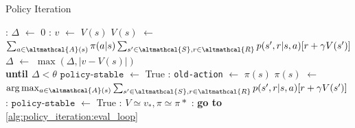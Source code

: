 \documentclass{article}
\newcommand*\Let[2]{\State #1 $\gets$ #2}
\begin{document}
\begin{algorithm}[H]
	\caption{Policy Iteration
		\label{alg:policy_eval}}
	\begin{algorithmic}[1]
		\Statex
		\Loop:  \label{alg:policy_iteration:eval_loop}
		\Let{$\Delta$}{0}
		: 
		\Let{$v$}{$V(s)$}
		\Let{$V(s)$}{$\sum_{a \in \altmathcal{A}(s)} \pi(a|s) \sum_{s' \in \altmathcal{S}, r \in \altmathcal{R}} p(s', r | s, a) [r + \gamma V(s')]$}
		\Let{$\Delta$}{$\max(\Delta, |v - V(s)|)$}
		\EndFor
		\EndLoop\\\textbf{until $\Delta < \theta$}
		\Statex
		\Let{$\texttt{policy-stable}$}{True} 
		: 
		\Let{\texttt{old-action}}{$\pi(s)$}
		\Let{$\pi(s)$}{$\arg \max_{a \in \altmathcal{A}(s)} \sum_{s' \in \altmathcal{S}, r \in \altmathcal{R}} p(s', r | s, a) [r + \gamma V(s')]$} 
		: 
		\Let{$\texttt{policy-stable}$}{True}
		\EndIf
		\EndFor
		:
		\State \Return $V \simeq v_*, \pi 
		\simeq \pi* $
		\Else: \State \textbf{ go to} \ref{alg:policy_iteration:eval_loop}
		\EndIf
	\end{algorithmic}
\end{algorithm}
\end{document}
